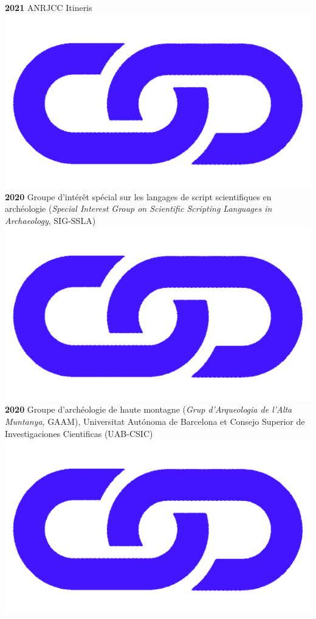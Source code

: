 \documentclass{article}
\begin{document}
\textbf{2021}  ANRJCC Itineris \href{https://anr.fr/Project-ANR-21-CE27-0010}{\includegraphics[scale=0.02]{link_darkblue.png}}\\ 
\textbf{2020}  Groupe d'intérêt spécial sur les langages de script scientifiques en archéologie (\textit{Special Interest Group on Scientific Scripting Languages in Archaeology}, SIG-SSLA) \href{https://sslarch.github.io/}{\includegraphics[scale=0.02]{link_darkblue.png}}\\ 
\textbf{2020} Groupe d'archéologie de haute montagne (\textit{Grup d'Arqueologia de l'Alta Muntanya}, GAAM), Universitat Aut\'{o}noma de Barcelona et Consejo Superior de Investigaciones Cientificas (UAB-CSIC) \href{https://arqueologiademuntanya.wordpress.com/}{\includegraphics[scale=0.02]{link_darkblue.png}}\\ 
\end{document}
